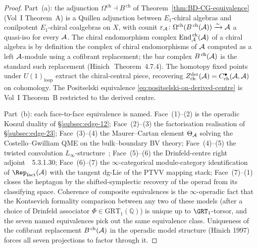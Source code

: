 \begin{proof}
Part~(a): the adjunction
$\Omega^{\mathrm{ch}}\dashv B^{\,\mathrm{ch}}$ of
Theorem~\ref{thm:BD-CG-equivalence} (Vol~I Theorem~A) is a
Quillen adjunction between $E_1$-chiral algebras and conilpotent
$E_1$-chiral coalgebras on $X$, with counit
$\varepsilon_{\mathcal{A}}\colon\Omega^{\mathrm{ch}}(B^{\,\mathrm{ch}}(\mathcal{A}))\xrightarrow{\sim}\mathcal{A}$
a quasi-iso for every $\mathcal{A}$. The chiral endomorphism complex
$\mathrm{End}^{\,\mathrm{ch}}_{\mathcal{A}}(\mathcal{A})$ of a chiral algebra is by
definition the complex of chiral endomorphisms of $\mathcal{A}$ computed
as a left $\mathcal{A}$-module using a cofibrant replacement; the bar
complex $B^{\,\mathrm{ch}}(\mathcal{A})$ is the standard such replacement
(Hinich~\cite{Hinich97}\,Theorem~4.7.4). The homotopy fixed
points under $U(1)_{\mathrm{loop}}$ extract the chiral-central
piece, recovering
$Z^{\mathrm{der}}_{\mathrm{ch}}(\mathcal{A})=C^{\bullet}_{\mathrm{ch}}(\mathcal{A},\mathcal{A})$
on cohomology. The Positselski equivalence
\eqref{eq:positselski-on-derived-centre} is Vol~I Theorem~B
restricted to the derived centre.

Part~(b): each face-to-face equivalence is named. Face~(1)--(2)
is the operadic Koszul duality of
\S\ref{subsec:edge-12}; Face~(2)--(3) the factorisation
realisation of \S\ref{subsec:edge-23}; Face~(3)--(4) the
Maurer--Cartan element $\Theta_{\mathcal{A}}$ solving the
Costello--Gwilliam QME on the bulk--boundary BV theory;
Face~(4)--(5) the twisted convolution
$L_\infty$-structure~\cite{Val07}; Face~(5)--(6) the
Drinfeld-centre right adjoint~\cite{LurieHA}~5.3.1.30;
Face~(6)--(7) the $\infty$-categorical module-category
identification of $\Rep_{\mathrm{fact}}(\cA)$ with the tangent
dg-Lie of the PTVV mapping stack; Face~(7)--(1) closes the
heptagon by the shifted-symplectic recovery of the operad from
its classifying space. Coherence of composite equivalences is
the $\infty$-operadic fact that the Kontsevich formality
comparison between any two of these models (after a choice of
Drinfeld associator $\Phi\in\mathrm{GRT}_1(\mathbb{Q})$) is
unique up to $\GRT_1$-torsor, and the seven named equivalences
pick out the same equivalence class. Uniqueness of the cofibrant
replacement $B^{\,\mathrm{ch}}(\mathcal{A})$ in the operadic model
structure (Hinich 1997) forces all seven projections to factor
through it.


\end{proof}
